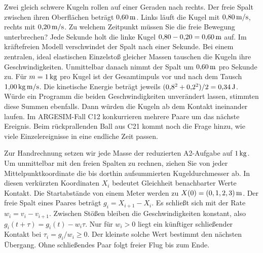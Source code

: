 Zwei gleich schwere Kugeln rollen auf einer Geraden nach rechts. Der freie Spalt zwischen ihren Oberflächen beträgt \(0{,}60\,\mathrm{m}\). Links läuft die Kugel mit \(0{,}80\,\mathrm{m/s}\), rechts mit \(0{,}20\,\mathrm{m/s}\). Zu welchem Zeitpunkt müssen Sie die freie Bewegung unterbrechen?
Jede Sekunde holt die linke Kugel \(0{,}80-0{,}20=0{,}60\,\mathrm{m}\) auf. Im kräftefreien Modell verschwindet der Spalt nach einer Sekunde. Bei einem zentralen, ideal elastischen Einzelstoß gleicher Massen tauschen die Kugeln ihre Geschwindigkeiten. Unmittelbar danach nimmt der Spalt um \(0{,}60\,\mathrm{m}\) pro Sekunde zu.
Für \(m=1\,\mathrm{kg}\) pro Kugel ist der Gesamtimpuls vor und nach dem Tausch \(1{,}00\,\mathrm{kg\,m/s}\). Die kinetische Energie beträgt jeweils \((0{,}8^2+0{,}2^2)/2=0{,}34\,\mathrm{J}\). Würde ein Programm die beiden Geschwindigkeiten unverändert lassen, stimmten diese Summen ebenfalls. Dann würden die Kugeln ab dem Kontakt ineinander laufen.
Im ARGESIM-Fall C12 konkurrieren mehrere Paare um das nächste Ereignis. Beim rückprallenden Ball aus C21 kommt noch die Frage hinzu, wie viele Einzelereignisse in eine endliche Zeit passen.


Zur Handrechnung setzen wir jede Masse der reduzierten A2-Aufgabe auf \(1\,\mathrm{kg}\). Um unmittelbar mit den freien Spalten zu rechnen, ziehen Sie von jeder Mittelpunktkoordinate die bis dorthin aufsummierten Kugeldurchmesser ab. In diesen verkürzten Koordinaten \(X_i\) bedeutet Gleichheit benachbarter Werte Kontakt. Die Startabstände von einem Meter werden zu \(X(0)=(0,1,2,3)\,\mathrm{m}\).
Der freie Spalt eines Paares beträgt \(g_i=X_{i+1}-X_i\). Es schließt sich mit der Rate \(w_i=v_i-v_{i+1}\). Zwischen Stößen bleiben die Geschwindigkeiten konstant, also \(g_i(t+\tau)=g_i(t)-w_i\tau\). Nur für \(w_i>0\) liegt ein künftiger schließender Kontakt bei \(\tau_i=g_i/w_i\ge0\). Der kleinste solche Wert bestimmt den nächsten Übergang. Ohne schließendes Paar folgt freier Flug bis zum Ende.

